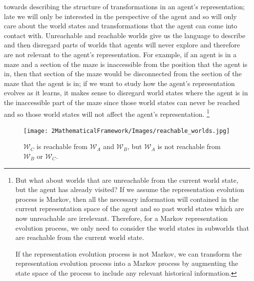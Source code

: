  towards describing the structure of transformations in an agent's representation; late we will only be interested in the perspective of the agent and so will only care about the world states and transformations that the agent can come into contact with.
Unreachable and reachable worlds give us the language to describe and then disregard parts of worlds that agents will never explore and therefore are not relevant to the agent's representation.
For example, if an agent is in a maze and a section of the maze is inaccessible from the position that the agent is in, then that section of the maze would be disconnected from the section of the maze that the agent is in; if we want to study how the agent’s representation evolves as it learns, it makes sense to disregard world states where the agent is in the inaccessible part of the maze since those world states can never be reached and so those world states will not affect the agent's representation.
\footnote{
	But what about worlds that are unreachable from the current world state, but the agent has already visited?
	If we assume the representation evolution process is Markov, then all the necessary information will contained in the current representation space of the agent and so past world states which are now unreachable are irrelevant.
	Therefore, for a Markov representation evolution process, we only need to consider the world states in subworlds that are reachable from the current world state.

	If the representation evolution process is not Markov, we can transform the representation evolution process into a Markov process by augmenting the state space of the process to include any relevant historical information.
}
\begin{figure}
	\centering
	\texttt{[image: 2MathematicalFramework/Images/reachable\_worlds.jpg]}
	\caption{
		$\mathscr{W}_{C}$ is reachable from $\mathscr{W}_{A}$ and $\mathscr{W}_{B}$, but $\mathscr{W}_{A}$ is not reachable from $\mathscr{W}_{B}$ or $\mathscr{W}_{C}$.
	}
	\label{fig:reachable_worlds}
\end{figure}



